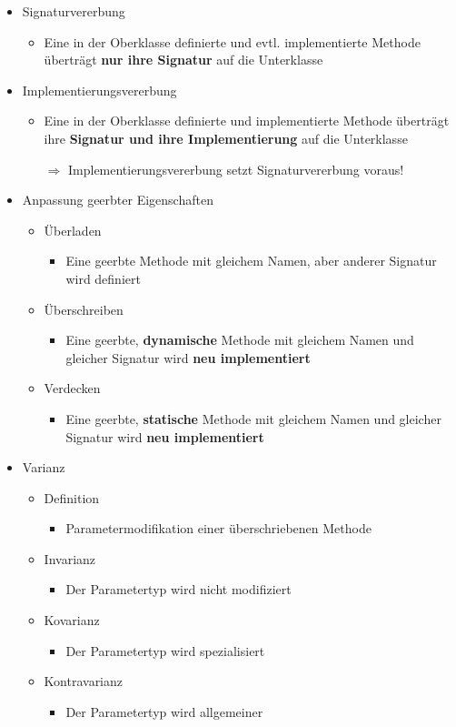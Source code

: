 \begin{itemize}
\item Signaturvererbung
\begin{itemize}
\item Eine in der Oberklasse definierte und evtl. implementierte Methode überträgt \textbf{nur ihre Signatur} auf die Unterklasse
\end{itemize}
\item Implementierungsvererbung
\begin{itemize}
\item Eine in der Oberklasse definierte und implementierte Methode überträgt ihre \textbf{Signatur und ihre Implementierung} auf die Unterklasse
					
$\Rightarrow$ Implementierungsvererbung setzt Signaturvererbung voraus!
\end{itemize}
\item Anpassung geerbter Eigenschaften
\begin{itemize}
\item Überladen
\begin{itemize}
\item Eine geerbte Methode mit gleichem Namen, aber anderer Signatur wird definiert
\end{itemize}
\item Überschreiben
\begin{itemize}
\item Eine geerbte, \textbf{dynamische} Methode mit gleichem Namen und gleicher Signatur wird \textbf{neu implementiert}
\end{itemize}
\item Verdecken
\begin{itemize}
\item Eine geerbte, \textbf{statische} Methode mit gleichem Namen und gleicher Signatur wird \textbf{neu implementiert}
\end{itemize}
\end{itemize}
\newpage
\item Varianz
\begin{itemize}
\item Definition
\begin{itemize}
\item Parametermodifikation einer überschriebenen Methode
\end{itemize}
\item Invarianz
\begin{itemize}
\item Der Parametertyp wird nicht modifiziert
\end{itemize}
\item Kovarianz
\begin{itemize}
\item Der Parametertyp wird spezialisiert
\end{itemize}
\item Kontravarianz
\begin{itemize}
\item Der Parametertyp wird allgemeiner
\end{itemize}
\end{itemize}
\end{itemize}
		
